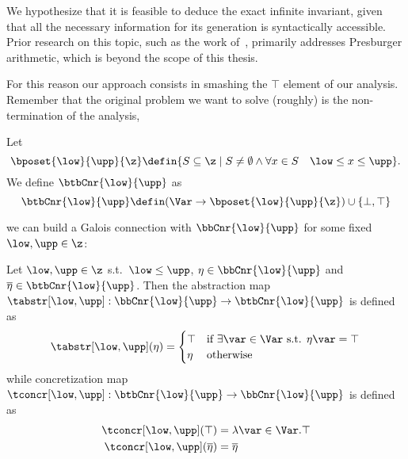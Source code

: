 We hypothesize that it is feasible to deduce the exact infinite
invariant, given that all the necessary information for its generation
is syntactically accessible. Prior research on this topic, such as the
work of~\cite{Lefaucheux2024}, primarily addresses Presburger
arithmetic, which is beyond the scope of this thesis.

For this reason our approach consists in smashing the \(\top\) element
of our analysis. Remember that the original problem we want to solve
(roughly) is the non-termination of the analysis,


\begin{definition}
  Let
  \begin{equation*}
    \bposet{\low}{\upp}{\z} \defin \{S \subseteq \z \mid S \neq \emptyset \land \forall x \in S \quad \low \leq x \leq \upp\}.
  \end{equation*}
  We define \(\btbCnr{\low}{\upp}\) as
  \begin{equation*}
    \btbCnr{\low}{\upp} \defin (\Var \to \bposet{\low}{\upp}{\z}) \cup \{\bot, \top\}
  \end{equation*}
\end{definition}

we can build a Galois connection with \(\bbCnr{\low}{\upp}\) for some
fixed \(\low, \upp \in \z\):

\begin{definition}
  Let \(\low, \upp \in \z\) s.t.\ \(\low \leq \upp\),
  \(\eta \in \bbCnr{\low}{\upp}\) and
  \(\overline\eta \in \btbCnr{\low}{\upp}\). Then the abstraction map
  \({\tabstr[\low,\upp]} : \bbCnr{\low}{\upp} \to \btbCnr{\low}{\upp}\) is
  defined as
  \begin{equation*}
    {\tabstr[\low,\upp]}(\eta) = \begin{cases}
      \top & \text{if } \exists\var\in\Var \text{ s.t. } \eta\var = \top \\
      \eta & \text{otherwise}
    \end{cases}
  \end{equation*}
  while concretization map
  \({\tconcr[\low,\upp]} : \btbCnr{\low}{\upp} \to \bbCnr{\low}{\upp}\)
  is defined as
  \begin{align*}
    \tconcr[\low,\upp](\top) & = \lambda \var \in \Var . \top \\
    \tconcr[\low,\upp](\overline\eta) & = \overline\eta
  \end{align*}
\end{definition}

